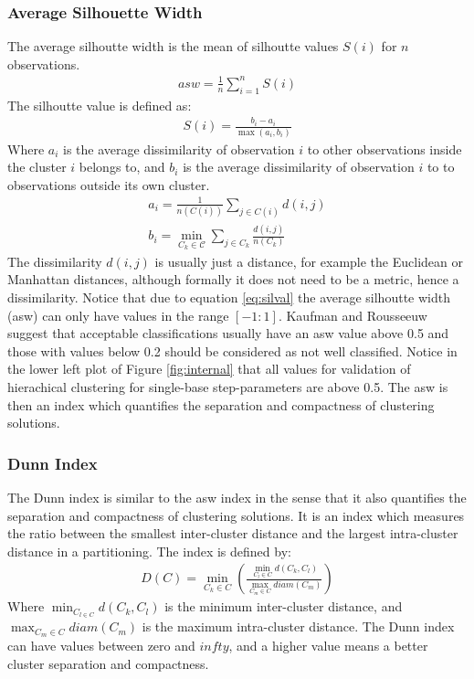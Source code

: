 \subsubsection{Average Silhouette Width}
The average silhoutte width is the mean of silhoutte values $S(i)$
for $n$ observations.
\begin{gather}
asw = \frac{1}{n} \sum_{i=1}^{n} S(i)
\end{gather}  
The silhoutte value is defined as:
\begin{gather}
\label{eq:silval}  
S(i) = \frac{b_{i}-a_{i}}{\max(a_{i},b_{i})}
\end{gather}
Where $a_{i}$ is the average dissimilarity of observation $i$ to other
observations inside the cluster $i$ belongs to, and
$b_{i}$ is the average dissimilarity of observation $i$ to to
observations outside its own cluster. 
\begin{gather}
a_{i} = \frac{1}{n(C(i))} \sum_{j \in C(i)} d(i,j)\\
b_{i} = \min_{C_{k} \in \mathcal{C}} \sum_{j \in C_{k}}\frac{d(i,j)}{n(C_{k})}
\end{gather}  
The dissimilarity $d(i,j)$ is usually just a distance, for example the
Euclidean or  Manhattan distances, although formally it  does not need
to be  a metric, hence a  dissimilarity.  Notice that  due to equation
\ref{eq:silval}  the  average silhoutte  width  (asw)  can only  have
values    in   the    range   $[-1:1]$.     Kaufman    and   Rousseeuw
\cite{kaufman1990}  suggest  that  acceptable classifications  usually
have an asw value above 0.5  and those with values below 0.2 should be
considered as not  well classified.  Notice in the  lower left plot of
Figure   \ref{fig:internal}  that   all  values   for   validation  of
hierachical clustering for  single-base step-parameters are above 0.5.
The  asw  is  then  an  index  which  quantifies  the  separation  and
compactness of clustering solutions.

\subsubsection{Dunn Index}
The Dunn index is  similar to the asw index in the  sense that it also
quantifies the separation and  compactness of clustering solutions. It
is   an  index  which   measures  the   ratio  between   the  smallest
inter-cluster  distance and  the largest  intra-cluster distance  in a
partitioning.  The index is defined by:
\begin{gather}
D(C) = \min_{C_{k} \in C} \left(  \frac{\min_{C_{l} \in C}
  d(C_{k},C_{l})}{\max_{C_{m} \in C} diam(C_{m})} \right)
\end{gather}
Where $\min_{C_{l \in C}} d(C_{k},C_{l})$ is the minimum inter-cluster
distance,  and  $\max_{C_{m}  \in   C}  diam(C_{m})$  is  the  maximum
intra-cluster distance.   The Dunn index can have  values between zero
and $infty$, and a higher  value means a better cluster separation and
compactness.

